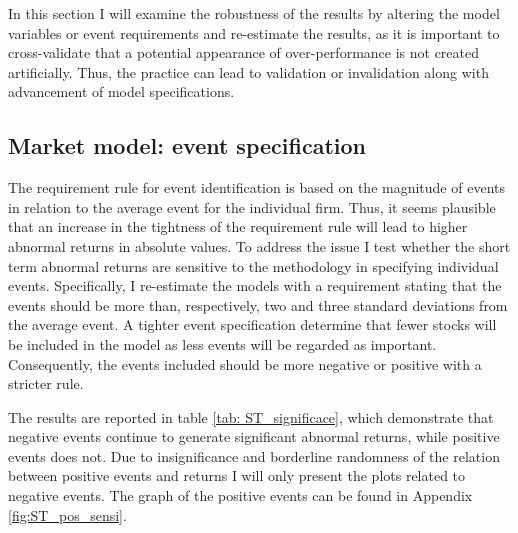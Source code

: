 




In this section I will examine the robustness of the results by altering the model variables or event requirements and re-estimate the results, as it is important to cross-validate that a potential appearance of over-performance is not created artificially. Thus, the practice can lead to validation or invalidation along with advancement of model specifications. 

\subsection{Market model: event specification}
The requirement rule for event identification is based on the magnitude of events in relation to the average event for the individual firm. Thus, it seems plausible that an increase in the tightness of the requirement rule will lead to higher abnormal returns in absolute values.  
To address the issue I test whether the short term abnormal returns are sensitive to the methodology in specifying individual events. Specifically, I re-estimate the models with a requirement stating that the events should be more than, respectively, two and three standard deviations from the average event. A tighter event specification determine that fewer stocks will be included in the model as less events will be regarded as important. Consequently, the events included should be more negative or positive with a stricter rule. 

The results are reported in table \ref{tab: ST_significace}, which demonstrate that negative events continue to generate significant abnormal returns, while positive events does not. Due to insignificance and borderline randomness of the relation between positive events and returns I will only present the plots related to negative events. The graph of the positive events can be found in Appendix \ref{fig:ST_pos_sensi}. 


